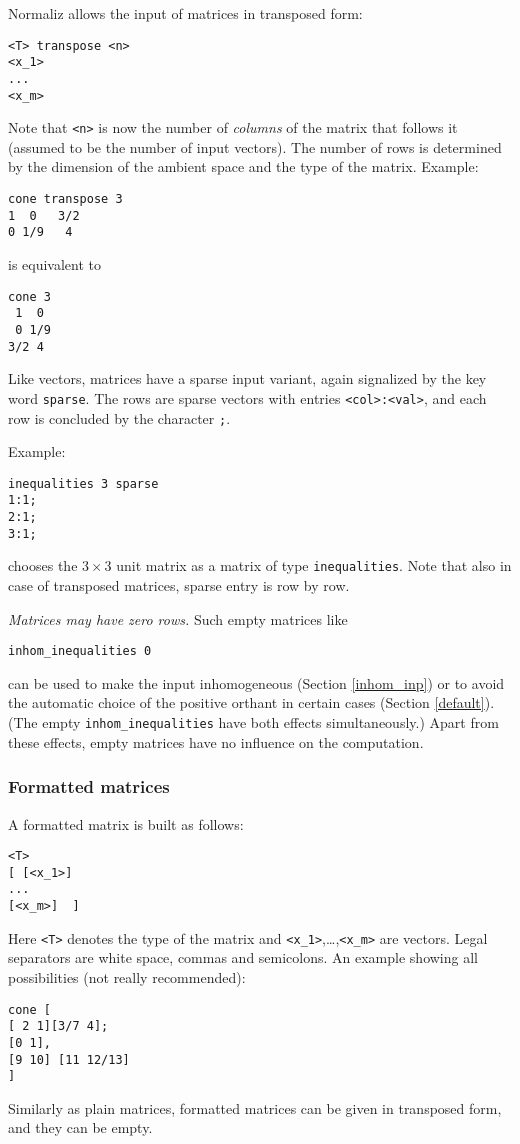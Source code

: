 \documentclass[12pt,a4paper]{scrartcl}
\theoremstyle{definition}
\def\ttt{\texttt}
\begin{document}
Normaliz allows the input of matrices in transposed form:
\begin{Verbatim}
<T> transpose <n>
<x_1>
...
<x_m>
\end{Verbatim}
Note that \verb|<n>| is now the number of \emph{columns} of the matrix that follows it (assumed to be the number of input vectors). The number of rows is determined by the dimension of the ambient space and the type of the matrix.  Example:
\begin{Verbatim}
cone transpose 3
1  0   3/2
0 1/9   4
\end{Verbatim}
is equivalent to
\begin{Verbatim}
cone 3
 1  0
 0 1/9
3/2 4
\end{Verbatim}

Like vectors, matrices have a sparse input variant, again signalized by the key word \verb|sparse|. The rows are sparse vectors with entries \verb|<col>:<val>|, and each row is concluded by the character \verb|;|.

Example:
\begin{Verbatim}
inequalities 3 sparse
1:1;
2:1;
3:1;
\end{Verbatim}
chooses the $3\times 3$ unit matrix as a matrix of type \verb|inequalities|. Note that also in case of transposed matrices, sparse entry is row by row.

\emph{Matrices may have zero rows.} Such empty matrices like
\begin{Verbatim}
inhom_inequalities 0
\end{Verbatim}

can be used to make the input inhomogeneous (Section \ref{inhom_inp}) or to avoid the automatic choice of the positive orthant in certain cases (Section \ref{default}). (The empty \verb|inhom_inequalities| have both effects simultaneously.) Apart from these effects, empty matrices have no influence on the computation.

\subsubsection{Formatted matrices}

A formatted matrix is built as follows:
\begin{Verbatim}
<T>
[ [<x_1>]
...
[<x_m>]  ]
\end{Verbatim}
Here \ttt{<T>} denotes the type of the matrix and \verb|<x_1>|,\dots,\verb|<x_m>| are vectors. Legal separators are white space, commas and semicolons. An example showing all possibilities (not really recommended):
\begin{Verbatim}
cone [
[ 2 1][3/7 4];
[0 1],
[9 10] [11 12/13]
]
\end{Verbatim} 
Similarly as plain matrices, formatted matrices can be given in transposed form, and they can be empty.
\end{document}
